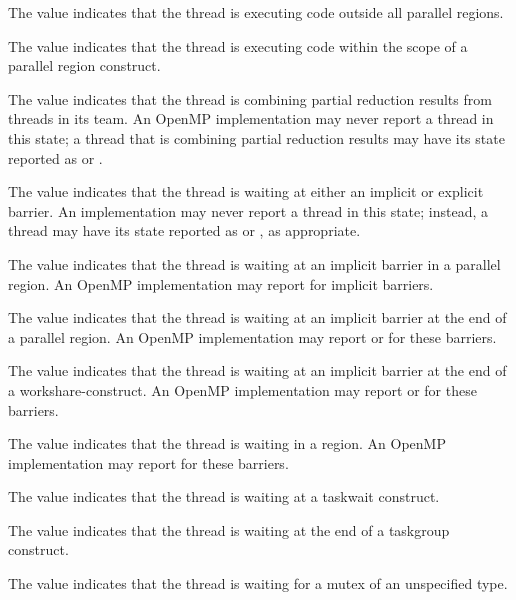 The value  indicates that the thread 
is executing code outside all parallel regions.

The value  indicates that the thread 
is executing code within the scope of a parallel region construct.

The value  indicates that the thread 
is combining partial reduction results from threads in its team. An 
OpenMP implementation may never report a thread in this state; a 
thread that is combining partial reduction results may have its state 
reported as  or .

The value  indicates that the thread is 
waiting at either an implicit or explicit barrier. An implementation 
may never report a thread in this state; instead, a thread may have its 
state reported as   or 
, as appropriate.

The value  indicates that the 
thread is waiting at an implicit barrier in a parallel region. An 
OpenMP implementation may report  for 
implicit barriers.

The value  indicates 
that the thread is waiting at an implicit barrier at the end of a parallel 
region. An OpenMP implementation may report  
or  for these barriers.

The value   indicates 
that the thread is waiting at an implicit barrier at the end of a 
workshare-construct. An OpenMP implementation may report 
 or  
for these barriers.

The value  indicates that the 
thread is waiting in a  region. An OpenMP implementation
may report  for these barriers.

The value  indicates that the thread is 
waiting at a taskwait construct. 

The value  indicates that the thread is 
waiting at the end of a taskgroup construct. 

The value  indicates that the thread is waiting 
for a mutex of an unspecified type. 

